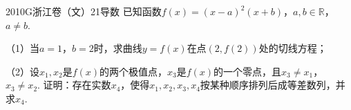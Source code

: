 
\begin{problem}{2010}{G}{浙江卷（文）}{21}{导数}
已知函数$f(x)=(x-a)^2(x+b)$，$a,b\in\mathbb{R}$，$a\neq b$.

（1）当$a=1$，$b=2$时，求曲线$y=f(x)$在点$(2,f(2))$处的切线方程；

（2）设$x_1,x_2$是$f(x)$的两个极值点，$x_3$是$f(x)$的一个零点，且$x_3\neq x_1$，$x_3\neq x_2$. 证明：存在实数$x_4$，使得$x_1,x_2,x_3,x_4$按某种顺序排列后成等差数列，并求$x_4$.
\end{problem}